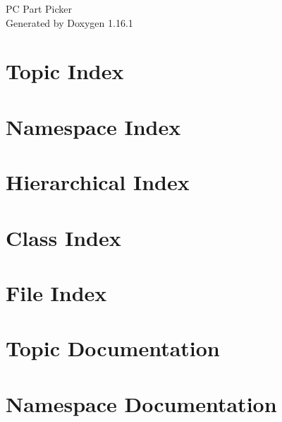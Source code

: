 \documentclass[twoside]{book}
\newcommand{\+}{\discretionary{\mbox{\scriptsize$\hookleftarrow$}}{}{}}
\newcommand{\clearemptydoublepage}{%
    \newpage{\pagestyle{empty}\cleardoublepage}%
  }
\begin{document}
  \raggedbottom
    \hypersetup{pageanchor=false,
                bookmarksnumbered=true,
                pdfencoding=unicode
               }
  \begin{titlepage}
  \vspace*{7cm}
  \begin{center}%
  {\Large PC Part Picker}\\
  \vspace*{1cm}
  {\large Generated by Doxygen 1.16.1}\\
  \end{center}
  \end{titlepage}
  \clearemptydoublepage
  \tableofcontents
  \clearemptydoublepage
  \hypersetup{pageanchor=true}


\chapter{Topic Index}

\chapter{Namespace Index}

\chapter{Hierarchical Index}

\chapter{Class Index}

\chapter{File Index}

\chapter{Topic Documentation}




\chapter{Namespace Documentation}







\end{document}
